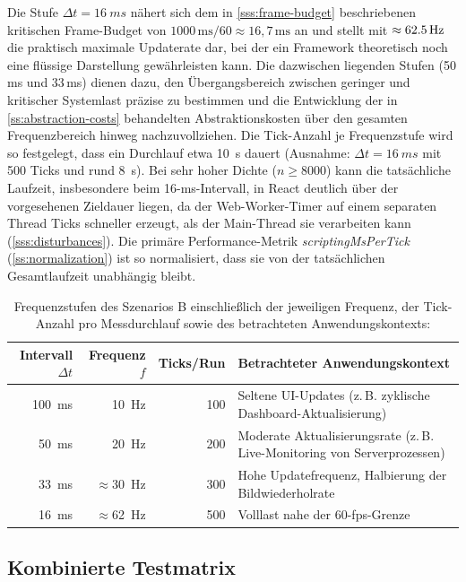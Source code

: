 \noindent Die Stufe $\Delta t = \qty{16}{ms}$ nähert sich dem in \cref{sss:frame-budget} beschriebenen kritischen Frame-Budget von $1000\,\mathrm{ms} / 60 \approx 16{,}7\,\mathrm{ms}$ an und stellt mit $\approx\qty{62{,}5}{Hz}$ die praktisch maximale Updaterate dar, bei der ein Framework theoretisch noch eine flüssige Darstellung gewährleisten kann. Die dazwischen liegenden Stufen (50\,ms und 33\,ms) dienen dazu, den Übergangsbereich zwischen geringer und kritischer Systemlast präzise zu bestimmen und die Entwicklung der in \cref{ss:abstraction-costs} behandelten Abstraktionskosten über den gesamten Frequenzbereich hinweg nachzuvollziehen. Die Tick-Anzahl je Frequenzstufe wird so festgelegt, dass ein Durchlauf etwa \qty{10}{s} dauert (Ausnahme: $\Delta t = \qty{16}{ms}$ mit 500 Ticks und rund \qty{8}{s}). Bei sehr hoher Dichte ($n \geq 8000$) kann die tatsächliche Laufzeit, insbesondere beim 16-ms-Intervall, in React deutlich über der vorgesehenen Zieldauer liegen, da der Web-Worker-Timer auf einem separaten Thread Ticks schneller erzeugt, als der Main-Thread sie verarbeiten kann (\cref{sss:disturbances}). Die primäre Performance-Metrik \textit{scriptingMsPerTick} (\cref{ss:normalization}) ist so normalisiert, dass sie von der tatsächlichen Gesamtlaufzeit unabhängig bleibt.
\begin{table}[H]
	\centering
	\caption[Frequenzstufen des Szenarios B]{Frequenzstufen des Szenarios B einschließlich der jeweiligen Frequenz, der Tick-Anzahl pro Messdurchlauf sowie des betrachteten Anwendungskontexts:}
	\label{tab:frequency-stages}
	\begin{tabular}{rrrp{6cm}}
		\hline
		Intervall $\Delta t$ & Frequenz $f$ & Ticks/Run & Betrachteter Anwendungskontext \\
		\hline
		\qty{100}{ms} & \qty{10}{Hz}          & 100 & Seltene UI-Updates (z.\,B. zyklische Dashboard-Aktualisierung) \\
		\qty{50}{ms}  & \qty{20}{Hz}          & 200 & Moderate Aktualisierungsrate (z.\,B. Live-Monitoring von Serverprozessen) \\
		\qty{33}{ms}  & $\approx$\qty{30}{Hz} & 300 & Hohe Updatefrequenz, Halbierung der Bildwiederholrate \\
		\qty{16}{ms}  & $\approx$\qty{62}{Hz} & 500 & Volllast nahe der 60-fps-Grenze \\
		\hline
	\end{tabular}
\end{table}

\subsection{Kombinierte Testmatrix}
\label{ss:test-matrix}


